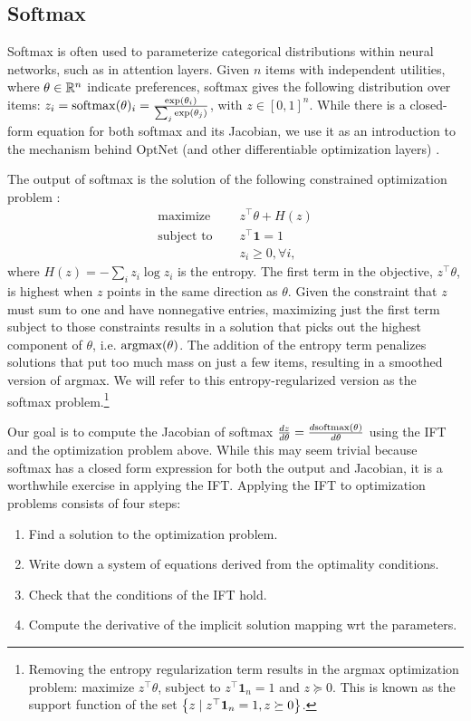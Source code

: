 \documentclass[11pt]{article}
\begin{document}
\subsection{Softmax}
Softmax is often used to parameterize categorical distributions within neural networks,
such as in attention layers.
Given $n$ items with independent utilities, where $\theta \in \mathbb{R}^n$
indicate preferences,
softmax gives the following distribution over items:
$z_i = \mathrm{softmax}(\theta)_i = \frac{\exp(\theta_i)}{\sum_j \exp(\theta_j)}$, with $z\in[0,1]^n$.
While there is a closed-form equation
for both softmax and its Jacobian,
we use it as an introduction to the mechanism
behind OptNet (and other differentiable optimization layers)
\citep{optnet,agrawal2019diffcvx}.

The output of softmax is the solution of the following constrained optimization problem
\citep{gao2018properties}:
\begin{equation}
\label{eqn:softmax-opt}
\begin{aligned}
\textrm{maximize } \quad & z^\top\theta + H(z)\\
\textrm{subject to } \quad & z^\top \mathbf{1} = 1\\
& z_i \geq 0, \forall i,
\end{aligned}
\end{equation}
where $H(z) = -\sum_i z_i \log z_i$ is the entropy.
The first term in the objective, $z^\top\theta$, is highest when $z$ points in the
same direction as $\theta$.
Given the constraint that $z$ must sum to one and have nonnegative entries,
maximizing just the first term subject to those constraints results in a solution
that picks out the highest component of $\theta$, i.e. $\operatorname*{argmax}(\theta)$.
The addition of the entropy term penalizes solutions that put too much
mass on just a few items, resulting in a smoothed version of argmax.
We will refer to this entropy-regularized version as the softmax problem.\footnote{
Removing the entropy regularization term results in the argmax optimization problem:
maximize $z^\top\theta$, subject to $z^\top\mathbf{1}_n=1$
and $z \succeq 0$.
This is known as the support function of the set $\left\{z\mid z^\top\mathbf{1}_n=1,z\succeq 0\right\}$.
}

Our goal is to compute the Jacobian of softmax
$\frac{dz}{d\theta} = \frac{d\mathrm{softmax}(\theta)}{d\theta}$
using the IFT and the optimization problem above.
While this may seem trivial because softmax has a closed form expression for
both the output and Jacobian, it is a worthwhile exercise in applying the IFT.
Applying the IFT to optimization problems consists of four steps:
\begin{enumerate}
\item Find a solution to the optimization problem.
\item Write down a system of equations derived from the optimality conditions.
\item Check that the conditions of the IFT hold.
\item Compute the derivative of the implicit solution mapping wrt the parameters.
\end{enumerate}
\end{document}
